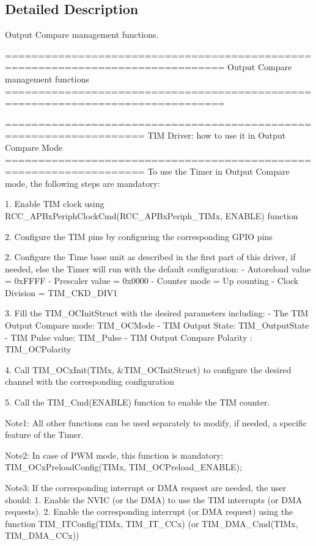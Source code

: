 \subsection{Detailed Description}
Output Compare management functions. \begin{DoxyVerb} ===============================================================================
                        Output Compare management functions
 ===============================================================================  
   
       ===================================================================      
              TIM Driver: how to use it in Output Compare Mode
       =================================================================== 
       To use the Timer in Output Compare mode, the following steps are mandatory:
       
       1. Enable TIM clock using RCC_APBxPeriphClockCmd(RCC_APBxPeriph_TIMx, ENABLE) function
       
       2. Configure the TIM pins by configuring the corresponding GPIO pins
       
       2. Configure the Time base unit as described in the first part of this driver, 
          if needed, else the Timer will run with the default configuration:
          - Autoreload value = 0xFFFF
          - Prescaler value = 0x0000
          - Counter mode = Up counting
          - Clock Division = TIM_CKD_DIV1
          
       3. Fill the TIM_OCInitStruct with the desired parameters including:
          - The TIM Output Compare mode: TIM_OCMode
          - TIM Output State: TIM_OutputState
          - TIM Pulse value: TIM_Pulse
          - TIM Output Compare Polarity : TIM_OCPolarity
       
       4. Call TIM_OCxInit(TIMx, &TIM_OCInitStruct) to configure the desired channel with the 
          corresponding configuration
       
       5. Call the TIM_Cmd(ENABLE) function to enable the TIM counter.
       
       Note1: All other functions can be used separately to modify, if needed,
              a specific feature of the Timer. 
          
       Note2: In case of PWM mode, this function is mandatory:
              TIM_OCxPreloadConfig(TIMx, TIM_OCPreload_ENABLE); 
              
       Note3: If the corresponding interrupt or DMA request are needed, the user should:
                1. Enable the NVIC (or the DMA) to use the TIM interrupts (or DMA requests). 
                2. Enable the corresponding interrupt (or DMA request) using the function 
                   TIM_ITConfig(TIMx, TIM_IT_CCx) (or TIM_DMA_Cmd(TIMx, TIM_DMA_CCx))   \end{DoxyVerb}
 

